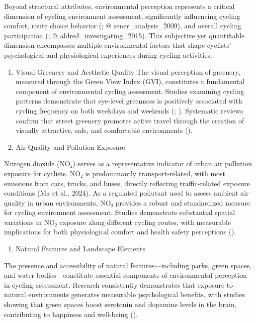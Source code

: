 \documentclass[
  12pt,
  oneside]{book}
\providecommand{\tightlist}{%
  \setlength{\itemsep}{0pt}\setlength{\parskip}{0pt}}
\begin{document}
Beyond structural attributes, environmental perception represents a critical dimension of cycling environment assessment, significantly influencing cycling comfort, route choice behavior (\textcite{broach_where_2012}; @ sener\_analysis\_2009), and overall cycling participation (\textcite{winters_motivators_2011}; @ aldred\_investigating\_2015). This subjective yet quantifiable dimension encompasses multiple environmental factors that shape cyclists' psychological and physiological experiences during cycling activities.

\begin{enumerate}
\def\labelenumi{\arabic{enumi}.}
\item
  Visual Greenery and Aesthetic Quality
  The visual perception of greenery, measured through the Green View Index (GVI), constitutes a fundamental component of environmental cycling assessment. Studies examining cycling patterns demonstrate that eye-level greenness is positively associated with cycling frequency on both weekdays and weekends (\textcite{lu_effect_2018}; \textcite{bai_exploring_2023}). Systematic reviews confirm that street greenery promotes active travel through the creation of visually attractive, safe, and comfortable environments (\textcite{nieuwenhuijsen_fifty_2017}).
\item
  Air Quality and Pollution Exposure
\end{enumerate}

Nitrogen dioxide (NO₂) serves as a representative indicator of urban air pollution exposure for cyclists. NO₂ is predominantly transport-related, with most emissions from cars, trucks, and buses, directly reflecting traffic-related exposure conditions (Ma et al., 2024). As a regulated pollutant used to assess ambient air quality in urban environments, NO₂ provides a robust and standardized measure for cycling environment assessment. Studies demonstrate substantial spatial variations in NO₂ exposure along different cycling routes, with measurable implications for both physiological comfort and health safety perceptions (\textcite{an_impact_2018}).

\begin{enumerate}
\def\labelenumi{\arabic{enumi}.}
\setcounter{enumi}{2}
\tightlist
\item
  Natural Features and Landscape Elements
\end{enumerate}

The presence and accessibility of natural features---including parks, green spaces, and water bodies---constitute essential components of environmental perception in cycling assessment. Research consistently demonstrates that exposure to natural environments generates measurable psychological benefits, with studies showing that green spaces boost serotonin and dopamine levels in the brain, contributing to happiness and well-being (\textcite{lee_health_2011}).
\end{document}
